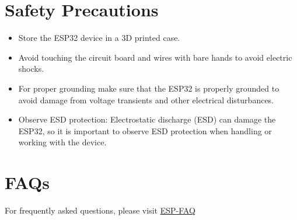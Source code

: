 \section{Safety Precautions}
\begin{itemize}
	\item Store the ESP32 device in a 3D printed case.
	\item Avoid touching the circuit board and wires with bare hands to avoid electric shocks.
	\item For proper grounding make sure that the ESP32 is properly grounded to avoid damage from voltage transients and other electrical disturbances.
	\item Observe ESD protection: Electrostatic discharge (ESD) can damage the ESP32, so it is important to observe ESD protection when handling or working with the device.
\end{itemize}

\section{FAQs}
For frequently asked questions, please visit
\href{https://docs.espressif.com/_/downloads/espressif-esp-faq/en/latest/pdf/}{ESP-FAQ}

